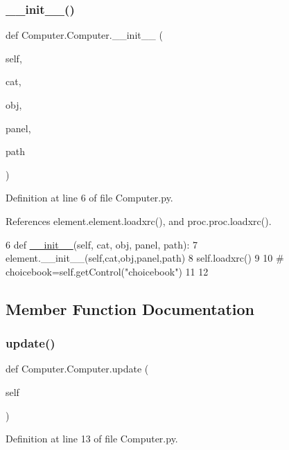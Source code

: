 \subsubsection{\texorpdfstring{\+\_\+\+\_\+init\+\_\+\+\_\+()}{\_\_init\_\_()}}
{\footnotesize\ttfamily def Computer.\+Computer.\+\_\+\+\_\+init\+\_\+\+\_\+ (\begin{DoxyParamCaption}\item[{}]{self,  }\item[{}]{cat,  }\item[{}]{obj,  }\item[{}]{panel,  }\item[{}]{path }\end{DoxyParamCaption})}



Definition at line 6 of file Computer.\+py.



References element.\+element.\+loadxrc(), and proc.\+proc.\+loadxrc().


\begin{DoxyCode}
6     \textcolor{keyword}{def }\hyperlink{classwrapper_1_1ModuleDictWrapper_a9a7a794150502f51df687831583e13b9}{\_\_init\_\_}(self, cat, obj, panel, path):
7         element.\_\_init\_\_(self,cat,obj,panel,path)
8         self.loadxrc()
9 
10 \textcolor{comment}{#        choicebook=self.getControl("choicebook")}
11 
12 
\end{DoxyCode}


\subsection{Member Function Documentation}
\mbox{\label{classComputer_1_1Computer_a41670b7dfe9ddf2e5070e55819e9b057}} 
\subsubsection{\texorpdfstring{update()}{update()}}
{\footnotesize\ttfamily def Computer.\+Computer.\+update (\begin{DoxyParamCaption}\item[{}]{self }\end{DoxyParamCaption})}



Definition at line 13 of file Computer.\+py.



